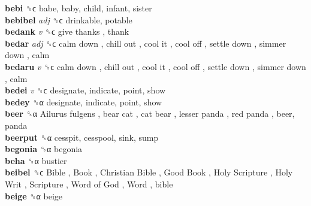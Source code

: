 \textbf{bebi} ␝ϲ  babe, baby, child, infant, sister  \\
\textbf{bebibel} \emph{adj}  ␝ϲ  drinkable, potable  \\
\textbf{bedank} \emph{v}  ␝ϲ   give thanks , thank  \\
\textbf{bedar} \emph{adj}  ␝ϲ   calm down ,  chill out ,  cool it ,  cool off ,  settle down ,  simmer down , calm  \\
\textbf{bedaru} \emph{v}  ␝ϲ   calm down ,  chill out ,  cool it ,  cool off ,  settle down ,  simmer down , calm  \\
\textbf{bedei} \emph{v}  ␝ϲ  designate, indicate, point, show  \\
\textbf{bedey} ␝α  designate, indicate, point, show  \\
\textbf{beer} ␝α   Ailurus fulgens ,  bear cat ,  cat bear ,  lesser panda ,  red panda , beer, panda  \\
\textbf{beerput} ␝α  cesspit, cesspool, sink, sump  \\
\textbf{begonia} ␝α  begonia  \\
\textbf{beha} ␝α  bustier  \\
\textbf{beibel} ␝ϲ   Bible ,  Book ,  Christian Bible ,  Good Book ,  Holy Scripture ,  Holy Writ ,  Scripture ,  Word of God ,  Word , bible  \\
\textbf{beige} ␝α  beige  \\
